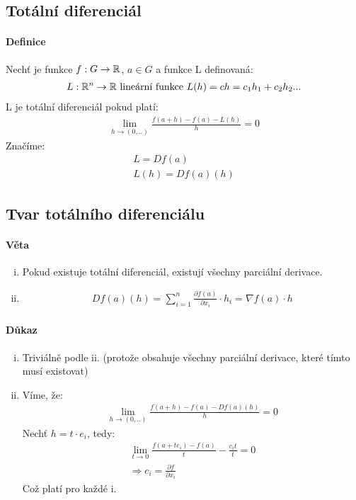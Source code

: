 \documentclass[a4paper,10pt]{article}
\begin{document}
\subsection{Totální diferenciál}
\setcounter{equation}{0}
\paragraph{Definice}
Nechť je funkce $f: G \to \mathbb{R}$, $a \in G$ a funkce L definovaná:
\begin{align*}
	L: \mathbb{R}^n \to \mathbb{R} \text{ lineární funkce } L(h) = ch = c_1 h_1 + c_2 h_2 ...
\end{align*}
L je totální diferenciál pokud platí:
\begin{align*}
	\lim_{h\to(0,..)} \frac{f(a+h) - f(a) - L(h)}{h} = 0
\end{align*}
Značíme:
\begin{align*}
	L = Df(a) \\
	L(h) = Df(a)(h)
\end{align*}

\subsection{Tvar totálního diferenciálu}
\setcounter{equation}{0}
\paragraph{Věta}
\begin{enumerate}[i.]
	\item Pokud existuje totální diferenciál, existují všechny parciální derivace.
	\item 
	\begin{align*}
		Df(a)(h) = \sum_{i=1}^n \frac{\partial f(a)}{\partial x_i} \cdot h_i =
		\nabla f(a) \cdot h
	\end{align*}	
\end{enumerate}
\paragraph{Důkaz}
\begin{enumerate}[i.]
	\item Triviálně podle ii. (protože obsahuje všechny parciální derivace,
	které tímto musí existovat)
	\item Víme, že:
		\begin{align}
			\lim_{h\to(0,..)} \frac{f(a+h) - f(a) - Df(a)(h)}{h} = 0
		\end{align}
		Nechť $h = t \cdot e_i$, tedy:
		\begin{align}
			\lim_{t\to0} \frac{f(a+te_i)-f(a)}{t} - \frac{c_i t}{t} = 0 \\
			\Rightarrow c_i = \frac{\partial f}{\partial x_i}
		\end{align}
		Což platí pro každé i.
\end{enumerate}
\end{document}
